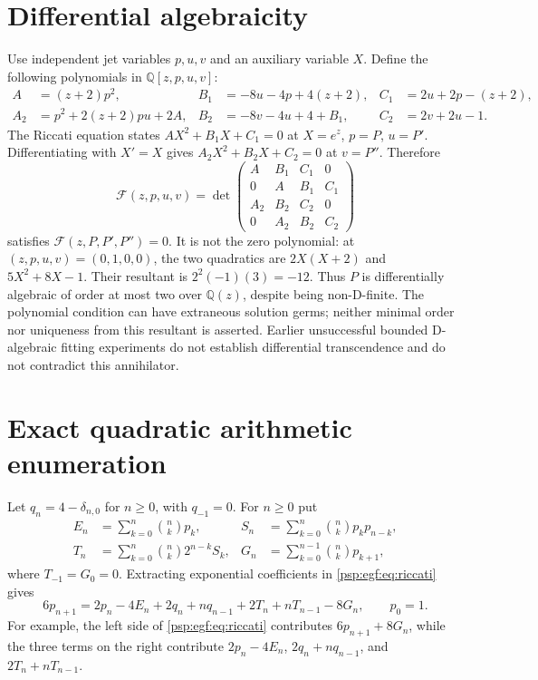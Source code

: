 \documentclass[11pt,letterpaper]{article}
\numberwithin{equation}{section}
\theoremstyle{remark}\newtheorem{remark}[theorem]{Remark}
\begin{document}
\section{Differential algebraicity}\label{psp:egf:sec:algebraic}
Use independent jet variables $p,u,v$ and an auxiliary variable $X$.
Define the following polynomials in $\mathbb Q[z,p,u,v]$:
\begin{align*}
 A&=(z+2)p^2,& B_1&=-8u-4p+4(z+2),& C_1&=2u+2p-(z+2),\\
 A_2&=p^2+2(z+2)pu+2A,&
 B_2&=-8v-4u+4+B_1,& C_2&=2v+2u-1.
\end{align*}
The Riccati equation states
$AX^2+B_1X+C_1=0$ at $X=e^z$, $p=P$, $u=P'$. Differentiating with
$X'=X$ gives $A_2X^2+B_2X+C_2=0$ at $v=P''$. Therefore
\begin{equation}\label{psp:egf:eq:resultant}
 \mathcal F(z,p,u,v)=\det
 \begin{pmatrix}
 A&B_1&C_1&0\\
 0&A&B_1&C_1\\
 A_2&B_2&C_2&0\\
 0&A_2&B_2&C_2
 \end{pmatrix}
\end{equation}
satisfies $\mathcal F(z,P,P',P'')=0$.
It is not the zero polynomial: at $(z,p,u,v)=(0,1,0,0)$, the two
quadratics are $2X(X+2)$ and $5X^2+8X-1$. Their resultant is
$2^2(-1)(3)=-12$. Thus $P$ is differentially algebraic of order at most
two over $\mathbb Q(z)$, despite being non-D-finite. The polynomial
condition can have extraneous solution germs; neither minimal order nor
uniqueness from this resultant is asserted. Earlier unsuccessful bounded
D-algebraic fitting experiments do not establish differential
transcendence and do not contradict this annihilator.

\section{Exact quadratic arithmetic enumeration}\label{psp:egf:sec:recurrence}
Let $q_n=4-\delta_{n,0}$ for $n\geq0$, with $q_{-1}=0$. For $n\geq0$ put
\begin{align*}
 E_n&=\sum_{k=0}^n\binom nkp_k,&
 S_n&=\sum_{k=0}^n\binom nkp_kp_{n-k},\\
 T_n&=\sum_{k=0}^n\binom nk2^{n-k}S_k,&
 G_n&=\sum_{k=0}^{n-1}\binom nkp_{k+1},
\end{align*}
where $T_{-1}=G_0=0$. Extracting exponential coefficients in
\eqref{psp:egf:eq:riccati} gives
\begin{equation}\label{psp:egf:eq:recurrence}
 \boxed{6p_{n+1}=2p_n-4E_n+2q_n+nq_{n-1}+2T_n+nT_{n-1}-8G_n},
 \qquad p_0=1.
\end{equation}
For example, the left side of \eqref{psp:egf:eq:riccati} contributes
$6p_{n+1}+8G_n$, while the three terms on the right contribute
$2p_n-4E_n$, $2q_n+nq_{n-1}$, and $2T_n+nT_{n-1}$.
\end{document}
